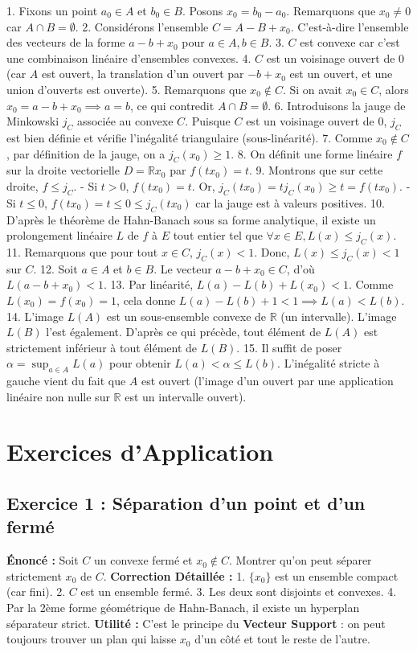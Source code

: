 \documentclass[11pt,a4paper]{article}
\begin{document}
1. Fixons un point $a_0 \in A$ et $b_0 \in B$. Posons $x_0 = b_0 - a_0$. Remarquons que $x_0 \neq 0$ car $A \cap B = \emptyset$.
2. Considérons l'ensemble $C = A - B + x_0$. C'est-à-dire l'ensemble des vecteurs de la forme $a - b + x_0$ pour $a \in A, b \in B$.
3. $C$ est convexe car c'est une combinaison linéaire d'ensembles convexes.
4. $C$ est un voisinage ouvert de $0$ (car $A$ est ouvert, la translation d'un ouvert par $-b+x_0$ est un ouvert, et une union d'ouverts est ouverte).
5. Remarquons que $x_0 \notin C$. Si on avait $x_0 \in C$, alors $x_0 = a - b + x_0 \implies a=b$, ce qui contredit $A \cap B = \emptyset$.
6. Introduisons la jauge de Minkowski $j_C$ associée au convexe $C$. Puisque $C$ est un voisinage ouvert de 0, $j_C$ est bien définie et vérifie l'inégalité triangulaire (sous-linéarité).
7. Comme $x_0 \notin C$, par définition de la jauge, on a $j_C(x_0) \ge 1$.
8. On définit une forme linéaire $f$ sur la droite vectorielle $D = \mathbb{R}x_0$ par $f(t x_0) = t$.
9. Montrons que sur cette droite, $f \le j_C$.
   - Si $t > 0$, $f(tx_0) = t$. Or, $j_C(tx_0) = t j_C(x_0) \ge t = f(tx_0)$.
   - Si $t \le 0$, $f(tx_0) = t \le 0 \le j_C(tx_0)$ car la jauge est à valeurs positives.
10. D'après le théorème de Hahn-Banach sous sa forme analytique, il existe un prolongement linéaire $L$ de $f$ à $E$ tout entier tel que $\forall x \in E, L(x) \le j_C(x)$.
11. Remarquons que pour tout $x \in C$, $j_C(x) < 1$. Donc, $L(x) \le j_C(x) < 1$ sur $C$.
12. Soit $a \in A$ et $b \in B$. Le vecteur $a - b + x_0 \in C$, d'où $L(a - b + x_0) < 1$.
13. Par linéarité, $L(a) - L(b) + L(x_0) < 1$. Comme $L(x_0) = f(x_0) = 1$, cela donne $L(a) - L(b) + 1 < 1 \implies L(a) < L(b)$.
14. L'image $L(A)$ est un sous-ensemble convexe de $\mathbb{R}$ (un intervalle). L'image $L(B)$ l'est également. D'après ce qui précède, tout élément de $L(A)$ est strictement inférieur à tout élément de $L(B)$.
15. Il suffit de poser $\alpha = \sup_{a \in A} L(a)$ pour obtenir $L(a) < \alpha \le L(b)$. L'inégalité stricte à gauche vient du fait que $A$ est ouvert (l'image d'un ouvert par une application linéaire non nulle sur $\mathbb{R}$ est un intervalle ouvert).



\section{Exercices d'Application}

\subsection{Exercice 1 : Séparation d'un point et d'un fermé}
\textbf{Énoncé :} Soit $C$ un convexe fermé et $x_0 \notin C$. Montrer qu'on peut séparer strictement $x_0$ de $C$.
\textbf{Correction Détaillée :}
1. $\{x_0\}$ est un ensemble compact (car fini).
2. $C$ est un ensemble fermé.
3. Les deux sont disjoints et convexes.
4. Par la 2ème forme géométrique de Hahn-Banach, il existe un hyperplan séparateur strict.
\textbf{Utilité :} C'est le principe du \textbf{Vecteur Support} : on peut toujours trouver un plan qui laisse $x_0$ d'un côté et tout le reste de l'autre.
\end{document}
